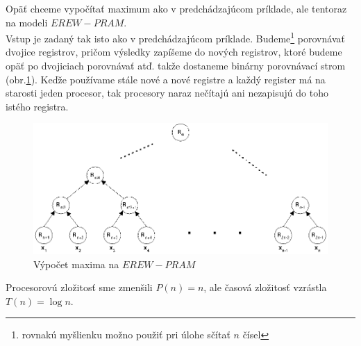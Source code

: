 \begin{priklad}
  \label{pram_prikl_2}

  Opäť chceme vypočítať maximum ako v predchádzajúcom príklade, ale
  tentoraz na modeli $EREW-PRAM$.
  \\ Vstup je zadaný tak isto ako v predchádzajúcom príklade.
  Budeme\footnote{rovnakú myšlienku možno použiť pri úlohe sčítať
  $n$ čísel} porovnávať dvojice registrov, pričom výsledky zapíšeme
  do nových registrov, ktoré budeme opäť po dvojiciach porovnávať
  atď. takže dostaneme binárny porovnávací strom
  (obr.\ref{pram_obr_maxstrom}). Keďže používame stále nové a nové registre a
  každý register má na starosti jeden procesor, tak procesory naraz
  nečítajú ani nezapisujú do toho istého registra.

  \begin{figure}[!ht]
   \centering
   \includegraphics{img/pram/maxstrom.eps}
   \caption{Výpočet maxima na $EREW-PRAM$} \label{pram_obr_maxstrom}
  \end{figure}

  Procesorovú zložitosť sme zmenšili $P(n)=n$, ale časová zložitosť
  vzrástla $T(n)=\log n$.
\end{priklad}

